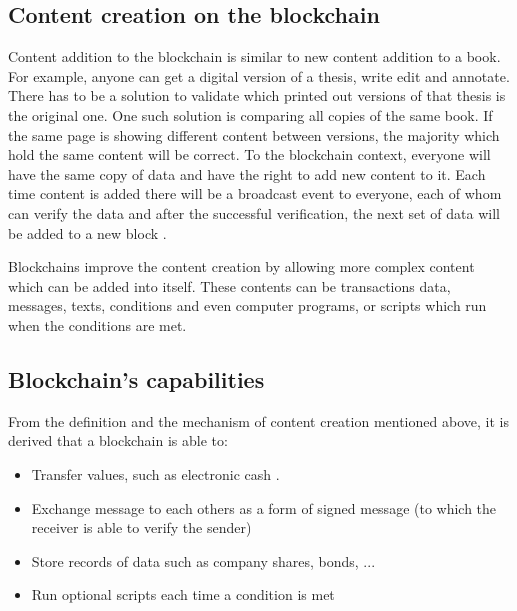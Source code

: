 \documentclass[twoside,numperchapter]{tutthesis} %
\begin{document}
\subsection{Content creation on the blockchain}
\label{contentCreationOnBlockchain}

Content addition to the blockchain is similar to new content addition to a book. For example, anyone can get a digital version of a thesis, write edit and annotate. There has to be a solution to validate which printed out versions of that thesis is the original one. One such solution is comparing all copies of the same book. If the same page is showing different content between versions, the majority which hold the same content will be correct. To the blockchain context, everyone will have the same copy of data and have the right to add new content to it. Each time content is added there will be a broadcast event to everyone, each of whom can verify the data and after the successful verification, the next set of data will be added to a new block \citep{RefWorks:doc:BitcoinWhitepaper}.

Blockchains improve the content creation by allowing more complex content which can be added into itself. These contents can be transactions data, messages, texts, conditions and even computer programs, or scripts which run when the conditions are met.

\subsection{Blockchain's capabilities}
\label{blockchainCapabilities}

From the definition and the mechanism of content creation mentioned above, it is derived that a blockchain is able to:

\begin{itemize}
    \item Transfer values, such as electronic cash \citep{RefWorks:doc:BitcoinWhitepaper}.
    \item Exchange message to each others as a form of signed message (to which the receiver is able to verify the sender) \citep{RefWorks:doc:EthereumWhitepaper}
    \item Store records of data such as company shares, bonds, ... \citep{RefWorks:doc:SecuritiesOnBlockchain}
    \item Run optional scripts each time a condition is met \citep[s.~20]{RefWorks:doc:MasteringBlockchain}
\end{itemize}
\end{document}
